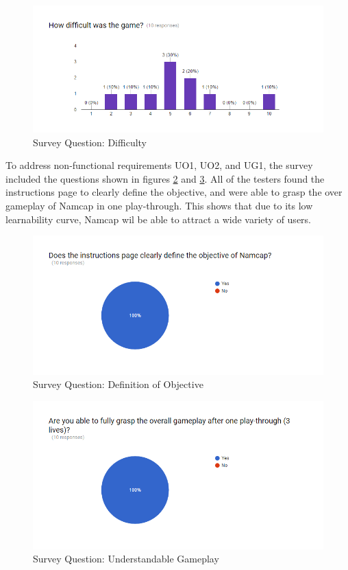 \documentclass[12pt, titlepage]{article}
\begin{document}
\begin{figure}[H]
\centering
\includegraphics[width=1.0\textwidth]{SurveyQuestion3.png}
\caption{Survey Question: Difficulty}
\label{FigSQ3}
\end{figure}

\noindent To address non-functional requirements UO1, UO2, and UG1, the survey included the questions shown in figures \ref{FigSQ6} and \ref{FigSQ7}. All of the testers found the instructions page to clearly define the objective, and were able to grasp the over gameplay of Namcap in one play-through. This shows that due to its low learnability curve, Namcap wil be able to attract a wide variety of users.

\begin{figure}[H]
\centering
\includegraphics[width=1.0\textwidth]{SurveyQuestion6.png}
\caption{Survey Question: Definition of Objective}
\label{FigSQ6}
\end{figure}

\begin{figure}[H]
\centering
\includegraphics[width=1.0\textwidth]{SurveyQuestion7.png}
\caption{Survey Question: Understandable Gameplay}
\label{FigSQ7}
\end{figure}
\end{document}
